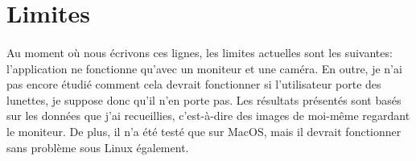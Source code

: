 \section{Limites}
\paragraph{}
Au moment où nous écrivons ces lignes, les limites actuelles sont les suivantes: l'application ne fonctionne qu'avec un moniteur et une caméra.
En outre, je n'ai pas encore étudié comment cela devrait fonctionner si l'utilisateur porte des lunettes, je suppose donc qu'il n'en porte pas.
Les résultats présentés sont basés sur les données que j'ai recueillies, c'est-à-dire des images de moi-même regardant le moniteur.
De plus, il n'a été testé que sur MacOS, mais il devrait fonctionner sans problème sous Linux également.
